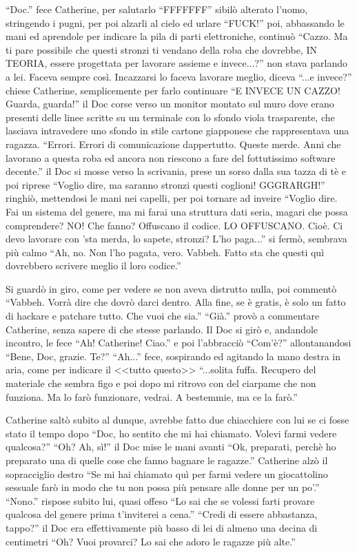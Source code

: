     ``Doc.'' fece Catherine, per salutarlo ``FFFFFFF'' sibilò alterato l'uomo, stringendo i pugni, per poi alzarli al
    cielo ed urlare ``FUCK!'' poi, abbassando le mani ed aprendole per indicare la pila di parti elettroniche, continuò
    ``Cazzo. Ma ti pare possibile che questi stronzi ti vendano della roba che dovrebbe, IN TEORIA, essere progettata
    per lavorare assieme e invece...?'' non stava parlando a lei. Faceva sempre così. Incazzarsi lo faceva lavorare
    meglio, diceva ``...e invece?'' chiese Catherine, semplicemente per farlo continuare ``E INVECE UN CAZZO! Guarda,
    guarda!'' il Doc corse verso un monitor montato sul muro dove erano presenti delle linee scritte su un terminale con
    lo sfondo viola trasparente, che lasciava intravedere uno sfondo in stile cartone giapponese che rappresentava una
    ragazza. ``Errori. Errori di comunicazione dappertutto. Queste merde. Anni che lavorano a questa roba ed ancora non
    riescono a fare del fottutissimo software decente.'' il Doc si mosse verso la scrivania, prese un sorso dalla sua
    tazza di tè e poi riprese ``Voglio dire, ma saranno stronzi questi coglioni! GGGRARGH!'' ringhiò, mettendosi le mani
    nei capelli, per poi tornare ad inveire ``Voglio dire. Fai un sistema del genere, ma mi farai una struttura dati
    seria, magari che possa comprendere? NO! Che fanno? Offuscano il codice. LO OFFUSCANO. Cioè. Ci devo lavorare con
    'sta merda, lo sapete, stronzi? L'ho paga...'' si fermò, sembrava più calmo ``Ah, no. Non l'ho pagata, vero. Vabbeh.
    Fatto sta che questi quì dovrebbero scrivere meglio il loro codice.''

    Si guardò in giro, come per vedere se non aveva distrutto nulla, poi commentò ``Vabbeh. Vorrà dire che dovrò darci
    dentro. Alla fine, se è gratis, è solo un fatto di hackare e patchare tutto. Che vuoi che sia.'' ``Già.'' provò a
    commentare Catherine, senza sapere di che stesse parlando. Il Doc si girò e, andandole incontro, le fece ``Ah!
    Catherine! Ciao.'' e poi l'abbracciò ``Com'è?'' allontanandosi ``Bene, Doc, grazie. Te?'' ``Ah...'' fece, sospirando
    ed agitando la mano destra in aria, come per indicare il <<tutto questo>> ``...solita fuffa. Recupero del materiale
    che sembra figo e poi dopo mi ritrovo con del ciarpame che non funziona. Ma lo farò funzionare, vedrai. A bestemmie,
    ma ce la farò.''

    Catherine saltò subito al dunque, avrebbe fatto due chiacchiere con lui se ci fosse stato il tempo dopo ``Doc, ho
    sentito che mi hai chiamato. Volevi farmi vedere qualcosa?'' ``Oh? Ah, sì!'' il Doc mise le mani avanti ``Ok,
    preparati, perchè ho preparato una di quelle cose che fanno bagnare le ragazze.'' Catherine alzò il sopracciglio
    destro ``Se mi hai chiamato quì per farmi vedere un giocattolino sessuale farò in modo che tu non possa più pensare
    alle donne per un po'.'' ``Nono.'' rispose subito lui, quasi offeso ``Lo sai che se volessi farti provare qualcosa
    del genere prima t'inviterei a cena.'' ``Credi di essere abbastanza, tappo?'' il Doc era effettivamente più basso di
    lei di almeno una decina di centimetri ``Oh? Vuoi provarci? Lo sai che adoro le ragazze più alte.''

